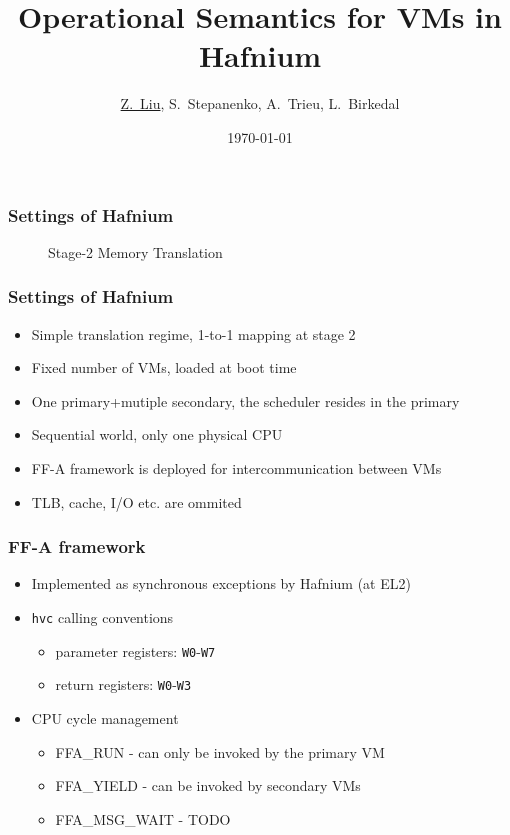 \documentclass{beamer}
\title{Operational Semantics for VMs in Hafnium}
\institute{Aarhus University}
\date{\today}
\author[Liu, Stepanenko, Trieu, Birkedal]
{\underline{Z.~Liu}, S.~Stepanenko, A.~Trieu, L.~Birkedal}
\institute[Aarhus]
{
  Department of Computer Science\\
  Aarhus University
}
\begin{document}
\frame{\titlepage}



\begin{frame}
  \frametitle{Settings of Hafnium}
  \begin{figure}

\caption{Stage-2 Memory Translation}
\end{figure}
\end{frame}

\begin{frame}
  \frametitle{Settings of Hafnium}
  \begin{itemize}
    \item Simple translation regime, 1-to-1 mapping at stage 2
    \item Fixed number of VMs, loaded at boot time
    \item One primary+mutiple secondary, the scheduler resides in the primary
    \item Sequential world, only one physical CPU
    \item FF-A framework is deployed for intercommunication between VMs
    \item TLB, cache, I/O etc. are ommited
  \end{itemize}
\end{frame}

\begin{frame}
  \frametitle{FF-A framework}
  \begin{itemize}
    \item Implemented as synchronous exceptions by Hafnium (at EL2)
    \item \texttt{hvc} calling conventions
      \begin{itemize}
        \item parameter registers: \texttt{W0}-\texttt{W7}
          \item return registers: \texttt{W0}-\texttt{W3}
          \end{itemize}
    \item CPU cycle management
      \begin{itemize}
        \item FFA\_RUN - can only be invoked by the primary VM
        \item FFA\_YIELD - can be invoked by secondary VMs
        \item FFA\_MSG\_WAIT - TODO
      \end{itemize}

  \end{itemize}
\end{frame}
\end{document}
